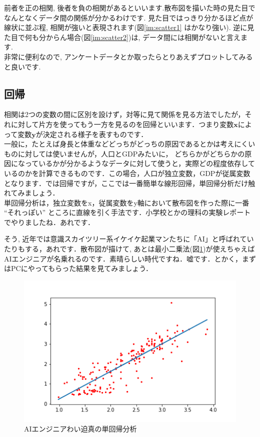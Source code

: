 \documentclass[11pt,a4paper]{jreport}
\begin{document}
前者を正の相関, 後者を負の相関があるといいます.散布図を描いた時の見た目でなんとなくデータ間の関係が分かるわけです. 見た目ではっきり分かるほど点が線状に並ぶ程, 相関が強いと表現されます(図\ref{im:scatter1} はかなり強い). 逆に見た目で何も分からん場合(図\ref{im:scatter2})は, データ間には相関がないと言えます. \\
非常に便利なので, アンケートデータとか取ったらとりあえずプロットしてみると良いです. 
\\
\subsection{回帰}
相関は2つの変数の間に区別を設けず，対等に見て関係を見る方法でしたが，それに対して片方を使ってもう一方を見るのを回帰といいます．つまり変数$\mathbf{x}$によって変数$\mathbf{y}$が決定される様子を表すものです．\\
一般に，たとえば身長と体重などどっちがどっちの原因であるとかは考えにくいものに対しては使いませんが，人口とGDPみたいに， どちらかがどちらかの原因になっているかが分かるようなデータに対して使うと，実際どの程度依存しているのかを計算できるものです．この場合，人口が独立変数，GDPが従属変数となります．では回帰ですが，ここでは一番簡単な線形回帰，単回帰分析だけ触れてみましょう．\\

単回帰分析は，独立変数をx，従属変数をy軸において散布図を作った際に一番 ``それっぽい'' ところに直線を引く手法です．小学校とかの理科の実験レポートでやりましたね．あれです．

そう, 近年では意識スカイツリー系イケイケ起業マンたちに「AI」と呼ばれていたりもする，あれです．散布図が描けて, あとは最小二乗法(図\ref{im:predict})が使えちゃえばAIエンジニアが名乗れるのです．素晴らしい時代ですね．嘘です．とかく，まずはPCにやってもらった結果を見てみましょう．\\


\begin{figure}[H]
\label{im:predict}
  \centering
  \includegraphics[width=120mm,bb=0 0 432 288]{../figures/predict.png}
  \caption{AIエンジニアわい迫真の単回帰分析}
\end{figure}
\end{document}

